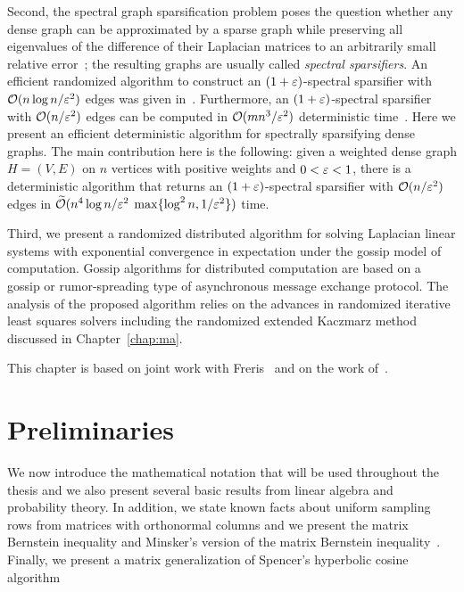 %
Second, the spectral graph sparsification problem poses the question whether any dense graph can be approximated by a sparse graph while preserving all eigenvalues of the difference of their Laplacian matrices to an arbitrarily small relative error~\cite{graph:sparsifier:ICM2010}; the resulting graphs are usually called \emph{spectral sparsifiers}. An efficient randomized algorithm to construct an $(1+\varepsilon)$-spectral sparsifier with $\mathcal{O}(n\log n /\varepsilon^2)$ edges was given in~\cite{graph:sparsifiers:eff_resistance}. Furthermore, an $(1+\varepsilon)$-spectral sparsifier with $\mathcal{O}(n/\varepsilon^2)$ edges can be computed in $\mathcal{O}(mn^3/\varepsilon^2)$ deterministic time~\cite{graph:sparsifiers:twice_ram}. Here we present an efficient deterministic algorithm for spectrally sparsifying dense graphs. The main contribution here is the following: given a weighted dense graph $H=(V,E)$ on $n$ vertices with positive weights and $0< \varepsilon <1$, there is a deterministic algorithm that returns an $(1+\varepsilon)$-spectral sparsifier with $\mathcal{O}(n/ \varepsilon^2)$ edges in $\widetilde{\mathcal{O}}(n^4 \log n /\varepsilon^2$ $ \max\{ \log^2 n, 1/\varepsilon^2 \})$ time.
%

%
Third, we present a randomized distributed algorithm for solving Laplacian linear systems with exponential convergence in expectation under the gossip model of computation. Gossip algorithms for distributed computation are based on a gossip or rumor-spreading type of asynchronous message exchange protocol. The analysis of the proposed algorithm relies on the advances in randomized iterative least squares solvers including the randomized extended Kaczmarz method discussed in Chapter~\ref{chap:ma}.
%
%
\begin{center}
This chapter is based on joint work with Freris~\cite{CDC12} and on the work of~\cite{ICALP12}.
\end{center}
\section{Preliminaries}
We now introduce the mathematical notation that will be used throughout the thesis and we also present several basic results from linear algebra and probability theory. In addition, we state known facts about uniform sampling rows from matrices with orthonormal columns and we present the matrix Bernstein inequality and Minsker's version of the matrix Bernstein inequality~\cite{minsker}. Finally, we present a matrix generalization of Spencer's hyperbolic cosine algorithm~\cite{hyperbolic_cosine:Spencer}
%
%
